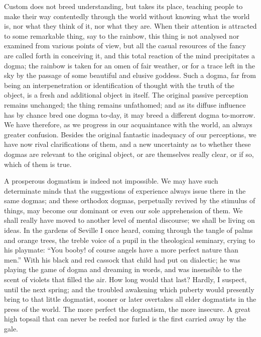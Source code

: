 Custom does not breed understanding, but takes its place, teaching
people to make their way contentedly through the world without knowing
what the world is, nor what they think of it, nor what they are. When
their attention is attracted to some remarkable thing, say to the
rainbow, this thing is not analysed nor examined from various points
of view, but all the casual resources of the fancy are called forth in
conceiving it, and this total reaction of the mind precipitates a
dogma; the rainbow is taken for an omen of fair weather, or for a
trace left in the sky by the passage of some beautiful and elusive
goddess. Such a dogma, far from being an interpenetration or
identification of thought with the truth of the object, is a fresh and
additional object in itself. The original passive perception remains
unchanged; the thing remains unfathomed; and as its diffuse influence
has by chance bred one dogma to-day, it may breed a different dogma
to-morrow. We have therefore, as we progress in our acquaintance with
the world, an always greater confusion. Besides the original fantastic
inadequacy of our perceptions, we have now rival clarifications of
them, and a new uncertainty as to whether these dogmas are relevant to
the original object, or are themselves really clear, or if so, which
of them is true.

A prosperous dogmatism is indeed not impossible. We may have
such determinate minds that the suggestions of experience always issue
there in the same dogmas; and these orthodox dogmas, perpetually
revived by the stimulus of things, may become our dominant or even our
sole apprehension of them. We shall really have moved to another level
of mental discourse; we shall be living on ideas. In the gardens of
Seville I once heard, coming through the tangle of palms and orange
trees, the treble voice of a pupil in the theological seminary, crying
to his playmate: ``You booby! of course angels have a more perfect
nature than men.'' With his black and red cassock that child had put
on dialectic; he was playing the game of dogma and dreaming in words,
and was insensible to the scent of violets that filled the air. How
long would that last? Hardly, I suspect, until the next spring; and
the troubled awakening which puberty would presently bring to that
little dogmatist, sooner or later overtakes all elder dogmatists in
the press of the world. The more perfect the dogmatism, the more
insecure. A great high topsail that can never be reefed nor furled is
the first carried away by the gale.

